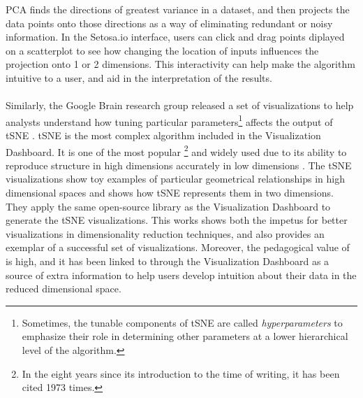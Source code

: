 \documentclass{sigchi}
\begin{document}
%
PCA finds the directions of greatest variance in a dataset, and then projects the data points onto those directions as a way of eliminating redundant or noisy information. %
%
In the Setosa.io interface, users can click and drag points diplayed on a scatterplot to see how changing the location of inputs influences the projection onto 1 or 2 dimensions. %
%
This interactivity can help make the algorithm intuitive to a user, and aid in the interpretation of the results. %
%
\\\\
%
Similarly, the Google Brain research group released a set of visualizations \cite{wattenberg2016how} to help analysts understand how tuning particular parameters\footnote{Sometimes, the tunable components of tSNE are called \textit{hyperparameters} to emphasize their role in determining other parameters at a lower hierarchical level of the algorithm.} affects the output of tSNE \cite{maaten2008visualizing}. %
%
tSNE is the most complex algorithm included in the Visualization Dashboard. %
%
It is one of the most popular%
%
\footnote{In the eight years since its introduction to the time of writing, it has been cited 1973 times.} %
%
and widely used due to its ability to reproduce structure in high dimensions accurately in low dimensions \cite{maaten2008visualizing}. %
%
The tSNE visualizations show toy examples of particular geometrical relationships in high dimensional spaces and shows how tSNE represents them in two dimensions. %
%
They apply the same open-source library as the Visualization Dashboard to generate the tSNE visualizations. %
%
This works shows both the impetus for better visualizations in dimensionality reduction techniques, and also provides an exemplar of a successful set of visualizations. %
%
Moreover, the pedagogical value of \cite{wattenberg2016how} is high, and it has been linked to through the Visualization Dashboard as a source of extra information to help users develop intuition about their data in the reduced dimensional space.
%
%
%
\end{document}
